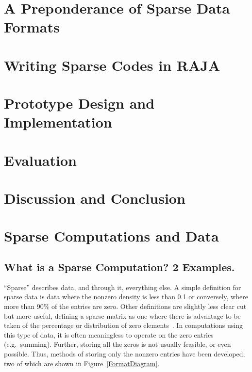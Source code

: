\section{A Preponderance of Sparse Data Formats}\label{sec:SparseFormats}

\section{Writing Sparse Codes in RAJA}\label{sec:IndexSets}

\section{Prototype Design and Implementation}\label{sec:SparseRAJA}

\section{Evaluation}\label{sec:SparseEval}

\section{Discussion and Conclusion}\label{sec:SparseDiscussion}


\section{Sparse Computations and Data}

\subsection{What is a Sparse Computation? 2 Examples.}

``Sparse'' describes data, and through it, everything else.
A simple definition for sparse data is data where the nonzero density is less than 0.1 or conversely, where more than 90\% of the entries are zero.
Other definitions are slightly less clear cut but more useful, defining a sparse matrix as one where there is advantage to be taken of the percentage or distribution of zero elements~\cite{duff1977survey}.
In computations using this type of data, it is often meaningless to operate on the zero entries (e.g.\ summing).
Further, storing all the zeros is not usually feasible, or even possible.
Thus, methods of storing only the nonzero entries have been developed, two of which are shown in Figure~\ref{FormatDiagram}.

